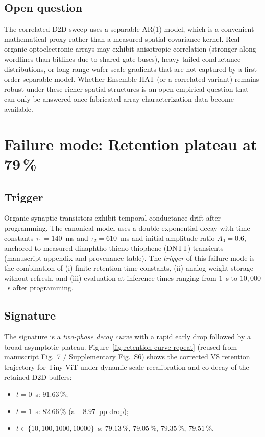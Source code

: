 \subsection{Open question}

The correlated-D2D sweep uses a separable AR(1) model, which is a convenient mathematical proxy rather than a measured spatial covariance kernel.  Real organic optoelectronic arrays may exhibit anisotropic correlation (stronger along wordlines than bitlines due to shared gate buses), heavy-tailed conductance distributions, or long-range wafer-scale gradients that are not captured by a first-order separable model.  Whether Ensemble HAT (or a correlated variant) remains robust under these richer spatial structures is an open empirical question that can only be answered once fabricated-array characterization data become available.


\section{Failure mode: Retention plateau at 79\,\%}
\label{sec:failure-retention-plateau}

\subsection{Trigger}

Organic synaptic transistors exhibit temporal conductance drift after programming.  The canonical model uses a double-exponential decay with time constants $\tau_{1}=140$~ms and $\tau_{2}=610$~ms and initial amplitude ratio $A_{0}=0.6$, anchored to measured dinaphtho-thieno-thiophene (DNTT) transients (manuscript appendix and provenance table).  The \emph{trigger} of this failure mode is the combination of (i) finite retention time constants, (ii) analog weight storage without refresh, and (iii) evaluation at inference times ranging from $1$~s to $10{,}000$~s after programming.

\subsection{Signature}

The signature is a \emph{two-phase decay curve} with a rapid early drop followed by a broad asymptotic plateau.  Figure~\ref{fig:retention-curve-repeat} (reused from manuscript Fig.~7 / Supplementary Fig.~S6) shows the corrected V8 retention trajectory for Tiny-ViT under dynamic scale recalibration and co-decay of the retained D2D buffers:
\begin{itemize}
    \item $t=0$~s: $91.63\,\%$;
    \item $t=1$~s: $82.66\,\%$ (a $-8.97$~pp drop);
    \item $t \in \{10, 100, 1000, 10000\}$~s: $79.13\,\%$, $79.05\,\%$, $79.35\,\%$, $79.51\,\%$.
\end{itemize}

